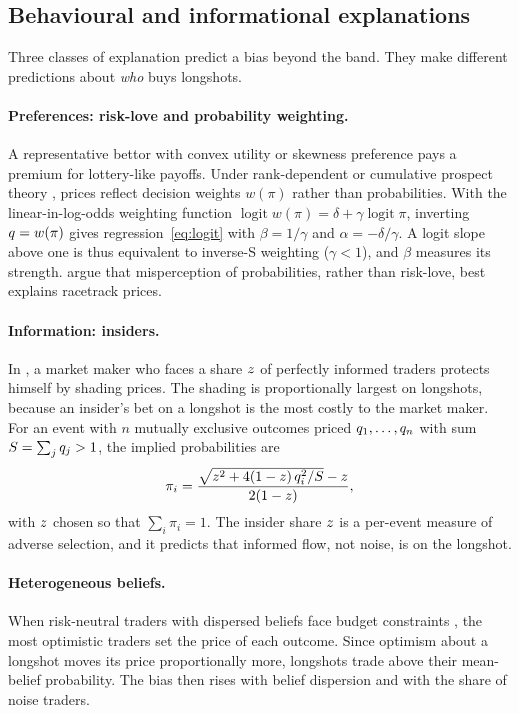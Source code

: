 \subsection{Behavioural and informational explanations}\label{sec:framework-theories}

Three classes of explanation predict a bias beyond the band. They make different predictions
about \emph{who} buys longshots.

\paragraph{Preferences: risk-love and probability weighting.} A representative bettor with
convex utility \citep{ali1977} or skewness preference \citep{golec1998} pays a premium for
lottery-like payoffs. Under rank-dependent or cumulative prospect theory
\citep{kahneman1979,tversky1992,jullien2000}, prices reflect decision weights $w(\pi)$ rather than
probabilities. With the linear-in-log-odds weighting function
$\operatorname{logit}w(\pi)=\delta+\gamma\operatorname{logit}\pi$, inverting $q=w(\pi)$ gives
regression~\eqref{eq:logit} with $\beta=1/\gamma$ and $\alpha=-\delta/\gamma$. A logit slope
above one is thus equivalent to inverse-S weighting ($\gamma<1$), and $\beta$ measures its
strength. \citet{snowbergwolfers2010} argue that misperception of probabilities, rather than
risk-love, best explains racetrack prices.

\paragraph{Information: insiders.} In \citet{shin1991,shin1993}, a market maker who faces a share
$z$ of perfectly informed traders protects himself by shading prices. The shading is
proportionally largest on longshots, because an insider's bet on a longshot is the most
costly to the market maker. For an event with $n$ mutually exclusive outcomes priced
$q_1,\dots,q_n$ with sum $S=\sum_jq_j>1$, the implied probabilities are
\begin{equation}\label{eq:shin}
  \pi_i=\frac{\sqrt{z^2+4(1-z)\,q_i^2/S}-z}{2(1-z)},
\end{equation}
with $z$ chosen so that $\sum_i\pi_i=1$. The insider share $z$ is a per-event measure
of adverse selection, and it predicts that informed flow, not noise, is on the longshot.

\paragraph{Heterogeneous beliefs.} When risk-neutral traders with dispersed beliefs face budget
constraints \citep{ali1977,gandhi2015}, the most optimistic traders set the price of each outcome.
Since optimism about a longshot moves its price proportionally more, longshots trade above their
mean-belief probability. The bias then rises with belief dispersion and with the share of noise
traders.

